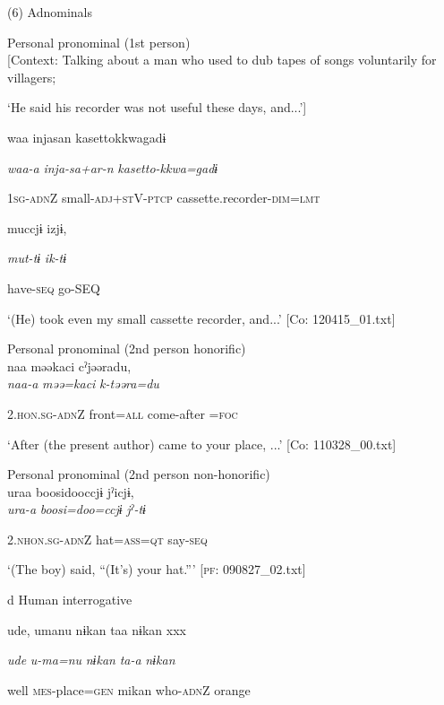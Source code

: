 (6)  Adnominals

 \ea Personal pronominal (1st person)\\{}
[Context: Talking about a man who used to dub tapes of songs voluntarily for villagers;

{\TM} ‘He said his recorder was not useful these days, and...’]

{\TM}
\gll waa  injasan  {\textbar}kasetto{\textbar}kkwagadɨ

      \textit{waa-a}  \textit{inja-sa+ar-n}\textsubscript{} \textit{kasetto-kkwa=gadɨ}

      1\textsc{sg}-\textsc{adn}Z  small-\textsc{adj}+\textsc{st}V-\textsc{ptcp}  cassette.recorder-\textsc{dim}=\textsc{lmt}

      muccjɨ  izjɨ,

      \textit{mut-tɨ}  \textit{ik-tɨ}

      have-\textsc{seq}  go-SEQ

\glt ‘(He) took even my small cassette recorder, and...’ [Co: 120415\_01.txt]
\z

 \ex Personal pronominal (2nd person honorific)\\
{\TM}
\gll  naa  məəkaci  cˀjəəradu,\\

      \textit{naa-a}  \textit{məə=kaci}  \textit{k-təəra=du}

      2.\textsc{hon}.\textsc{sg}-\textsc{adn}Z  front=\textsc{all}  come-after =\textsc{foc}

\glt ‘After (the present author) came to your place, ...’ [Co: 110328\_00.txt]
\z

 \ex Personal pronominal (2nd person non-honorific)\\
{\TM}
\gll  uraa  {\textbar}boosi{\textbar}dooccjɨ  jˀicjɨ,\\

      \textit{ura-a}  \textit{boosi=doo=ccjɨ}  \textit{jˀ-tɨ}

      2.\textsc{nhon}.\textsc{sg}-\textsc{adn}Z  hat=\textsc{ass}=\textsc{qt}  say-\textsc{seq}

\glt ‘(The boy) said, “(It’s) your hat.”’ [\textsc{pf}: 090827\_02.txt]
\z

  d  Human interrogative

{\TM}
\gll ude,  umanu  nɨkan  taa  nɨkan  xxx

      \textit{ude}  \textit{u-ma=nu}  \textit{nɨkan}  \textit{ta-a}  \textit{nɨkan}  

      well  \textsc{mes}-place=\textsc{gen}  mikan  who-\textsc{adn}Z  orange

